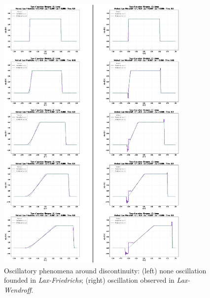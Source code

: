 \begin{figure}[ht]
	\includegraphics[width=0.84\textwidth]{LFvsLW.eps}
	\caption{Oscillatory phenomena around discontinuity:
		(left) none oscillation founded in  \emph{Lax-Friedrichs};
		(right) oscillation observed in \emph{Lax-Wendroff}.}
	\label{\LABEL}
\end{figure}
